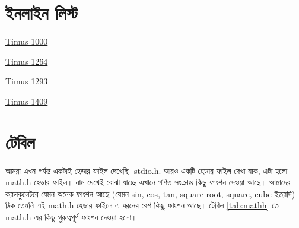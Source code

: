 \section{ইনলাইন লিস্ট}
\begin{inparaitem}
\item \href{http://acm.timus.ru/problem.aspx?space=1&num=1000}{Timus 1000}
\item \href{http://acm.timus.ru/problem.aspx?space=1&num=1264}{Timus 1264}
\item \href{http://acm.timus.ru/problem.aspx?space=1&num=1293}{Timus 1293}
\item \href{http://acm.timus.ru/problem.aspx?space=1&num=1409}{Timus 1409}
\end{inparaitem}

\section{টেবিল}

আমরা এখন পর্যন্ত একটাই হেডার ফাইল দেখেছি- stdio.h. আরও একটি হেডার ফাইল দেখা যাক, এটা হলো math.h হেডার ফাইল। নাম দেখেই বোঝা যাচ্ছে এখানে গণিত সংক্রান্ত কিছু ফাংশন দেওয়া আছে। আমাদের ক্যালকুলেটরে যেমন অনেক ফাংশন আছে (যেমন sin, cos, tan, square root, square, cube ইত্যাদি) ঠিক তেমনি এই math.h হেডার ফাইলে এ ধরনের বেশ কিছু ফাংশন আছে। টেবিল \ref{tab:mathh} তে math.h এর কিছু গুরুত্বপূর্ণ ফাংশন দেওয়া হলো। 

